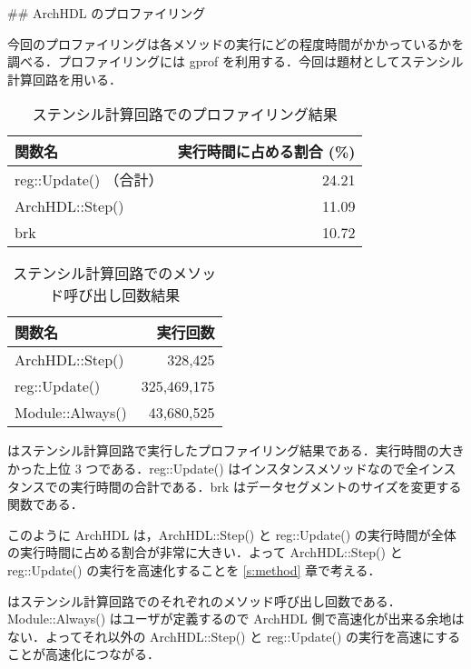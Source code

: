 ## ArchHDL のプロファイリング \label{ss:profiling}

今回のプロファイリングは各メソッドの実行にどの程度時間がかかっているかを調べる．プロファイリングには
gprof \cite{gprof}を利用する．今回は題材としてステンシル計算回路を用いる．

\begin{table}[t]
 \caption{ステンシル計算回路でのプロファイリング結果}
 \label{table:stencil_prof}
 \begin{center}
  \begin{tabular}{lr} \toprule
  関数名 & 実行時間に占める割合 (\%) \\ \midrule
  reg::Update() （合計） & 24.21 \\
  ArchHDL::Step() & 11.09 \\
  brk & 10.72 \\ \bottomrule
  \end{tabular}
 \end{center}
\end{table}

\begin{table}[t]
 \caption{ステンシル計算回路でのメソッド呼び出し回数結果}
 \label{table:stencil_method_call_count}
 \begin{center}
  \begin{tabular}{lr} \toprule
  関数名 & 実行回数 \\ \midrule
  ArchHDL::Step()   &     328,425 \\
  reg::Update()     & 325,469,175 \\
  Module::Always()  &  43,680,525 \\ \bottomrule
  \end{tabular}
 \end{center}
\end{table}


 はステンシル計算回路で実行したプロファイリング結果である．実行時間の大きかった上位 3 つである．reg::Update() はインスタンスメソッドなので全インスタンスでの実行時間の合計である．brk はデータセグメントのサイズを変更する関数である．

このように ArchHDL は，ArchHDL::Step() と reg::Update() の実行時間が全体の実行時間に占める割合が非常に大きい．よって ArchHDL::Step() と reg::Update() の実行を高速化することを \ref{s:method} 章で考える．

 はステンシル計算回路でのそれぞれのメソッド呼び出し回数である．Module::Always() はユーザが定義するので ArchHDL 側で高速化が出来る余地はない．よってそれ以外の ArchHDL::Step() と reg::Update() の実行を高速にすることが高速化につながる．



